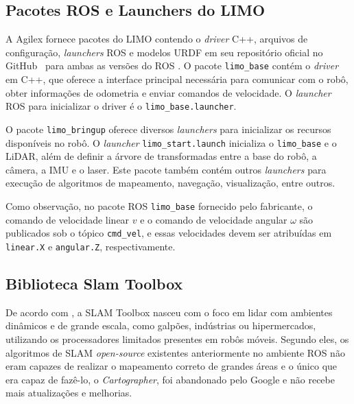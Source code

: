     

    \subsection{Pacotes ROS e Launchers do LIMO}
    \label{sec:ROS_LIMO}
            
        A Agilex fornece pacotes do LIMO contendo o \textit{driver} C++, arquivos de configuração, \textit{launchers} ROS e modelos URDF em seu repositório oficial no GitHub~\cite{GithubAgilex} para ambas as versões do ROS \cite{limoRos1,limoRos2}. O pacote \texttt{limo\_base} contém o \textit{driver} em C++, que oferece a interface principal necessária para comunicar com o robô, obter informações de odometria e enviar comandos de velocidade. O \textit{launcher} ROS para inicializar o driver é o \texttt{limo\_base.launcher}.
        
        O pacote \texttt{limo\_bringup} oferece diversos \textit{launchers} para inicializar os recursos disponíveis no robô. O \textit{launcher} \texttt{limo\_start.launch} inicializa o \texttt{limo\_base} e o LiDAR, além de definir a árvore de transformadas entre a base do robô, a câmera, a IMU e o laser. Este pacote também contém outros \textit{launchers} para execução de algoritmos de mapeamento, navegação, visualização, entre outros.
    
        Como observação, no pacote ROS \texttt{limo\_base} fornecido pelo fabricante, o comando de velocidade linear $v$ e o comando de velocidade angular $\omega$ são publicados sob o tópico \texttt{cmd\_vel}, e essas velocidades devem ser atribuídas em \texttt{linear.X} e \texttt{angular.Z}, respectivamente.

    \subsection{Biblioteca Slam Toolbox}
    \label{sec:SLAM_Toolbox}

    

    De acordo com , a SLAM Toolbox nasceu com o foco em lidar com ambientes dinâmicos e de grande escala, como galpões, indústrias ou hipermercados, utilizando os processadores limitados presentes em robôs móveis. Segundo eles, os algoritmos de SLAM \textit{open-source} existentes anteriormente no ambiente ROS não eram capazes de realizar o mapeamento correto de grandes áreas e o único que era capaz de fazê-lo, o \textit{Cartographer}, foi abandonado pelo Google e não recebe mais atualizações e melhorias.


